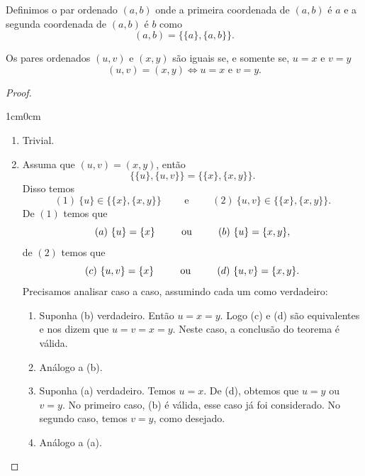 \begin{definicao}
    \label{def:par_ordenado}
    Definimos o par ordenado \((a,b)\) onde a primeira coordenada de \((a,b)\) é \(a\) e a segunda coordenada de \((a,b)\) é \(b\) como
    \[
        (a,b) = \{\{a\}, \{a,b\}\}.
    \]
\end{definicao}

\begin{proposicao}
    \label{prop:par_ordenado}
    Os pares ordenados \((u,v)\) e \((x,y)\) são iguais se, e somente se, \(u=x\) e \(v=y\)
    \[
        (u,v) = (x,y) \iff u = x \text{ e } v = y.
    \]
\end{proposicao}

\begin{proof}
    \begin{adjustwidth}{1cm}{0cm}
        \begin{enumerate}
            \item[\((\impliedby)\)] Trivial.
            \item[\((\implies)\)] Assuma que \((u,v) = (x,y)\), então
                  \[
                      \{\{u\}, \{u,v\}\} = \{\{x\}, \{x,y\}\}.
                  \]
                  Disso temos
                  \[
                      (1) \ \{u\} \in \{\{x\}, \{x,y\}\} \qquad \text{ e } \qquad (2) \ \{u,v\} \in \{\{x\}, \{x,y\}\}.
                  \]
                  De \((1)\) temos que
                  \[
                      (a) \ \{u\} = \{x\} \qquad \ \text{ ou }\  \qquad (b) \ \{u\} = \{x,y\},
                  \]
                  de \((2)\) temos que
                  \[
                      (c) \ \{u,v\} = \{x\} \qquad \ \text{ ou }\  \qquad (d) \ \{u,v\} = \{x,y\}.
                  \]
                  Precisamos analisar caso a caso, assumindo cada um como verdadeiro:
                  \begin{enumerate}
                      \item[(b)] Suponha  (b) verdadeiro. Então \(u = x = y\). Logo (c) e (d) são equivalentes e nos dizem que \(u = v = x = y\). Neste caso, a conclusão do teorema é válida.
                      \item[(c)] Análogo a (b).
                      \item[(a)] Suponha (a) verdadeiro. Temos \(u = x\). De (d), obtemos que \(u = y\) ou \(v = y\). No primeiro caso, (b) é válida, esse caso já foi considerado. No segundo caso, temos \(v = y\), como desejado.
                      \item[(d)] Análogo a (a).
                  \end{enumerate}
        \end{enumerate}
    \end{adjustwidth}
\end{proof}

